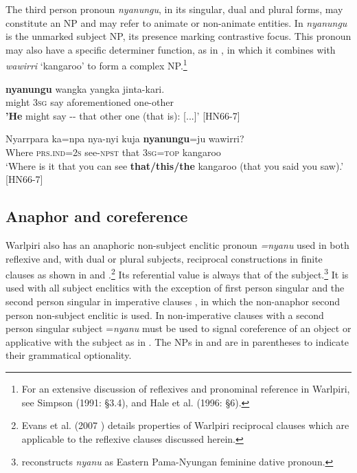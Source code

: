 \documentclass[output=paper]{../langscibook}
\begin{document}
The third person pronoun \textit{nyanungu}, in its singular, dual and plural forms, may constitute an NP and may refer to animate or non-animate entities. In  \textit{nyanungu} is the unmarked subject NP, its presence marking contrastive focus. This pronoun may also have a specific determiner function, as in , in which it combines with \textit{wawirri} `kangaroo' to form a complex NP.\footnote{For an extensive discussion of reflexives and pronominal reference in Warlpiri, see Simpson (1991: §3.4), and Hale et al. (1996: §6).}

\ea%
    \label{ex:laughren:8}

\ea
\label{ex:laughren:8a}
 \textbf{{nyanungu}} wangka   yangka  jinta-kari.\\
    might  3\textsc{sg}  say  aforementioned  one-other\\
\glt    \textbf{{}'He} might say -{}- that other one (that is): [...]' [HN66-7]

\ex
\label{ex:laughren:8b}
\gll Nyarrpara   ka=npa   nya-nyi  kuja \textbf{{nyanungu}}=ju  wawirri?\\
    Where  \textsc{prs.ind=2s}  see-\textsc{npst}  that  3\textsc{sg=top}  kangaroo\\
  \glt `Where is it that you can see \textbf{that/this/the} kangaroo (that you said you saw).' [HN66-7]
  \z
\z


\subsection{Anaphor and coreference}\label{sec:laughren:2.2}

Warlpiri also has an anaphoric non-subject enclitic pronoun \textit{=nyanu} used in both reflexive and, with dual or plural subjects, reciprocal constructions in finite clauses as shown in  and .\footnote{Evans et al. (2007 ) details properties of Warlpiri reciprocal clauses which are applicable to the reflexive clauses discussed herein.} Its referential value is always that of the subject.\footnote{\citet{Blake1988} reconstructs \textit{nyanu} as Eastern Pama-Nyungan feminine dative pronoun.} It is used with all subject enclitics with the exception of first person singular  and the second person singular in imperative clauses , in which the non-anaphor second person non-subject enclitic is used. In non-imperative clauses with a second person singular subject =\textit{nyanu} must be used to signal coreference of an object or applicative with the subject as in . The NPs in  and  are in parentheses to indicate their grammatical optionality.
\end{document}
